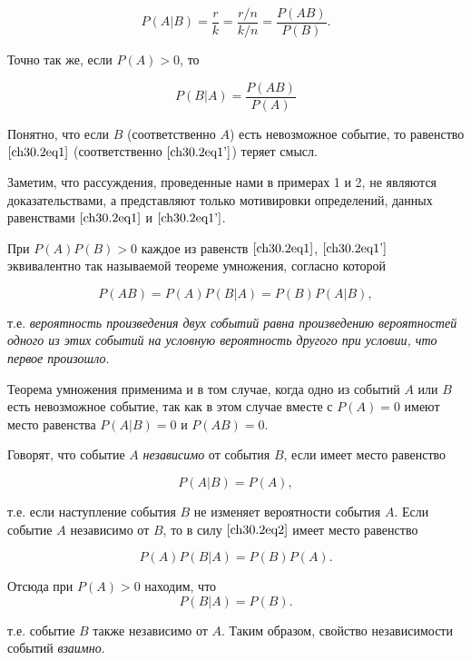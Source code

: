 \begin{equation} \label{ch30.2eq1}
P(A|B) = \frac{r}{k} = \frac{r/n}{k/n} = \frac{P(AB)}{P(B)}.
\end{equation}

Точно так же, если $P(A) > 0$, то

\begin{equation} \label{ch30.2eq1'}
P(B|A) = \frac{P(AB)}{P(A)}
\end{equation}

Понятно, что если $B$ (соответственно $A$) есть невозможное событие, то равенство $\eqref{ch30.2eq1}$ (соответственно $\eqref{ch30.2eq1'}$) теряет смысл.

Заметим, что рассуждения, проведенные нами в примерах 1 и 2, не являются доказательствами, а представляют только мотивировки определений, данных равенствами $\eqref{ch30.2eq1}$ и $\eqref{ch30.2eq1'}$.

При $P(A)P(B) > 0$ каждое из равенств $\eqref{ch30.2eq1}$, $\eqref{ch30.2eq1'}$  эквивалентно так называемой теореме умножения, согласно которой

\begin{equation} \label{ch30.2eq2}
P(AB) = P(A)P(B|A) = P(B)P(A|B),
\end{equation}

т.е. \textit{вероятность произведения двух событий равна произведению вероятностей одного из этих событий на условную вероятность другого при условии, что первое произошло}.

Теорема умножения применима и в том случае, когда одно из событий $A$ или $B$ есть невозможное событие, так как в этом случае вместе с $P(A) = 0$ имеют место равенства $P(A|B) = 0$ и $P(AB) = 0$.

Говорят, что событие $A$ \textit{независимо} от события $B$, если имеет место равенство

\begin{equation} \label{ch30.2eq3}
P(A|B) = P(A),
\end{equation}

т.е. если наступление события $B$ не изменяет вероятности события $A$. Если событие $A$ независимо от $B$, то в силу $\eqref{ch30.2eq2}$ имеет место равенство

$$
P(A)P(B|A) = P(B)P(A).
$$

Отсюда при $P(A) > 0$ находим, что
\begin{equation} \label{ch30.2eq4}
P(B|A) = P(B).
\end{equation}

т.е. событие $B$ также независимо от $A$. Таким образом, свойство независимости событий \textit{взаимно}.

